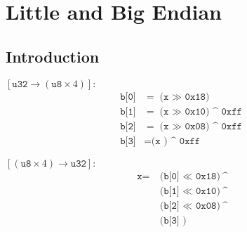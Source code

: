 \newpage
\section{Little and Big Endian}
\subsection{Introduction}


\begin{center}\begin{minipage}{.4\textwidth}\centering
	$[\texttt{u32}\to(\texttt{u8}\times 4)]:$
	\begin{align*}
	\texttt{b[0]} &= \texttt{(x\ $\gg$ 0x18)} \\
	\texttt{b[1]} &= \texttt{(x\ $\gg$ 0x10)\ \textasciicircum\ 0xff} \\
	\texttt{b[2]} &= \texttt{(x\ $\gg$ 0x08)\ \textasciicircum\ 0xff} \\
	\texttt{b[3]} &= \texttt{(x\ \ \ \ \ \ \ \ )\ \textasciicircum\ 0xff}
\end{align*}
	\end{minipage}
\begin{minipage}{.4\textwidth}\centering
	$[(\texttt{u8}\times 4)\to\texttt{u32}]:$
	\begin{align*}
		\texttt{x} = &\ \texttt{(b[0] $\ll$ 0x18)}\ \texttt{\textasciicircum}\\
		&\ \texttt{(b[1] $\ll$ 0x10)}\ \texttt{\textasciicircum}\\
		&\ \texttt{(b[2] $\ll$ 0x08)}\ \texttt{\textasciicircum}\\
		&\ \texttt{(b[3] \ \ \ \ \ \ \ )}
	\end{align*}
\end{minipage}
\end{center}
\vspace{20pt}
